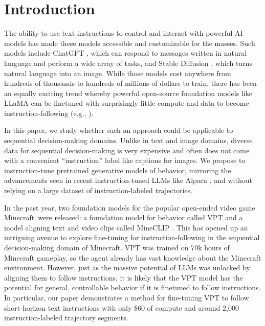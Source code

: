 \vspace{-1.25em}
\section{Introduction}
\vspace{-0.5em}

The ability to use text instructions to control and interact with powerful AI models has made these models accessible and customizable for the masses. Such models include ChatGPT \citep{chatgpt}, which can respond to messages written in natural language and perform a wide array of tasks, and Stable Diffusion \citep{rombach2022ldm}, which turns natural language into an image. While those models cost anywhere from hundreds of thousands to hundreds of millions of dollars to train, there has been an equally exciting trend whereby powerful open-source foundation models like LLaMA \citep{llama} can be finetuned with surprisingly little compute and data to become instruction-following (e.g., \citep{alpaca, vicuna2023}). 

In this paper, we study whether such an approach could be applicable to sequential decision-making domains. Unlike in text and image domains, diverse data for sequential decision-making is very expensive and often does not come with a convenient “instruction” label like captions for images. We propose to instruction-tune pretrained generative models of behavior, mirroring the advancements seen in recent instruction-tuned LLMs like Alpaca \citep{alpaca}, and without relying on a large dataset of instruction-labeled trajectories.

In the past year, two foundation models for the popular open-ended video game Minecraft\texttrademark\ were released: a foundation model for behavior called VPT \citep{baker2022vpt} and a model aligning text and video clips called MineCLIP \citep{fan2022minedojo}. This has opened up an intriguing avenue to explore fine-tuning for instruction-following in the sequential decision-making domain of Minecraft. VPT was trained on 70k hours of Minecraft gameplay, so the agent already has vast knowledge about the Minecraft environment. However, just as the massive potential of LLMs was unlocked by aligning them to follow instructions, it is likely that the VPT model has the potential for general, controllable behavior if it is finetuned to follow instructions. In particular, our paper demonstrates a method for fine-tuning VPT to follow short-horizon text instructions with only \$60 of compute and around 2,000 instruction-labeled trajectory segments. 

